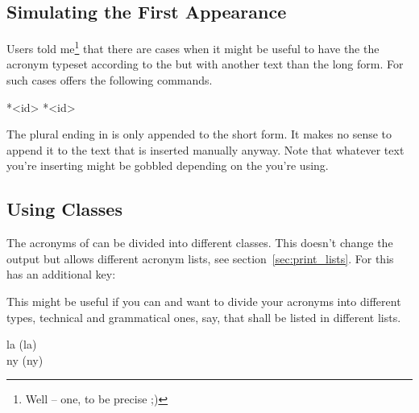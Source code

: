 \documentclass[DIV10,toc=index,toc=bib,hyperfootnotes=false]{cnpkgdoc}
\begin{document}
\subsection{Simulating the First Appearance}
\noindent{}%
Users told me\footnote{Well -- one, to be precise ;)} that there are cases when it
might be useful to have the the acronym typeset according to the 
but with another text than the long form. For such cases \acro offers the
following commands.
\begin{beschreibung}
 *{<id>}
 *{<id>}
\end{beschreibung}

\begin{beispiel}
\end{beispiel}

The plural ending in  is only appended to the short form. It makes
no sense to append it to the text that is inserted manually anyway. Note that
whatever text you're inserting might be gobbled depending on the 
you're using.

\subsection{Using Classes}
The acronyms of \acro can be divided into different classes. This doesn't change
the output but allows different acronym lists, see section~\ref{sec:print_lists}.
For this  has an additional key:
\begin{beschreibung}
\end{beschreibung}

This might be useful if you can and want to divide your acronyms into different
types, technical and grammatical ones, say, that shall be listed in different
lists.

\begin{beispiel}
 \acl{la} (\acs{la}) \\
 \acl{ny} (\acs{ny})
\end{beispiel}
\end{document}
